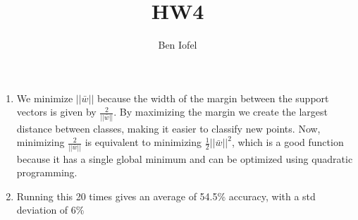 \documentclass[11pt]{article}
\author{Ben Iofel}
\date{}
\title{HW4}
\begin{document}
\maketitle
\begin{enumerate}
\item We minimize \(||\bar{w}||\) because the width of the margin between the support vectors is given by \(\frac{2}{||\bar{w}||}\). By maximizing the margin we create the largest distance between classes, making it easier to classify new points. Now, minimizing \(\frac{2}{||\bar{w}||}\) is equivalent to minimizing \(\frac{1}{2}||\bar{w}||^2\), which is a good function because it has a single global minimum and can be optimized using quadratic programming.
\item Running this 20 times gives an average of 54.5\% accuracy, with a std deviation of 6\%
\end{enumerate}
\end{document}
